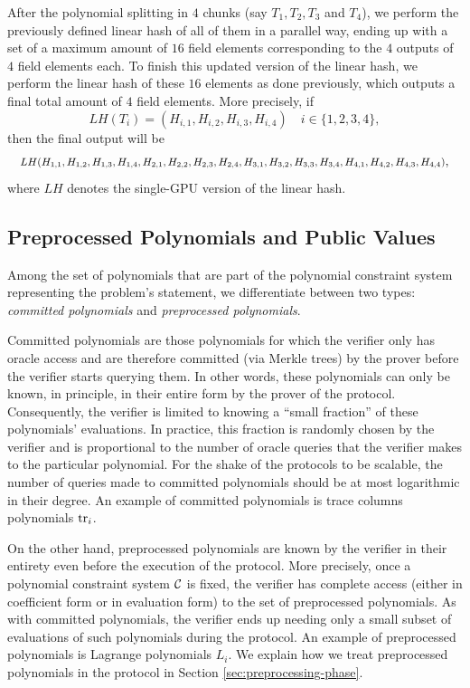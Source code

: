 After the polynomial splitting in $4$ chunks (say $T_1, T_2, T_3$ and $T_4$), we perform the previously defined linear hash of all of them in a parallel way, ending up with a set of a maximum amount of $16$ field elements corresponding to the $4$ outputs of $4$ field elements each. To finish this updated version of the linear hash, we perform the linear hash of these $16$ elements as done previously, which outputs a final total amount of $4$ field elements. More precisely, if 
\[
LH(T_i) = (H_{i, 1}, H_{i, 2}, H_{i, 3}, H_{i, 4})	\quad i \in \{1, 2, 3, 4\},
\]
then the final output will be
\[
\scalebox{0.85}{\mbox{\ensuremath{\displaystyle 
			LH(H_{1, 1}, H_{1, 2}, H_{1, 3}, H_{1, 4}, H_{2, 1}, H_{2, 2}, H_{2, 3}, H_{2, 4}, H_{3, 1}, H_{3, 2}, H_{3, 3}, H_{3, 4}, H_{4, 1}, H_{4, 2}, H_{4, 3}, H_{4, 4})
}}},
\]
where $LH$ denotes the single-GPU version of the linear hash. 


\fi



\subsection{Preprocessed Polynomials and Public Values}\label{sec:preprocessed-public}

Among the set of polynomials that are part of the polynomial constraint system representing the problem's statement, we differentiate between two types: \textit{committed polynomials} and \textit{preprocessed polynomials}. 

Committed polynomials are those polynomials for which the verifier only has oracle access and are therefore committed (via Merkle trees) by the prover before the verifier starts querying them. In other words, these polynomials can only be known, in principle, in their entire form by the prover of the protocol. Consequently, the verifier is limited to knowing a ``small fraction'' of these polynomials' evaluations. In practice, this fraction is randomly chosen by the verifier and is proportional to the number of oracle queries that the verifier makes to the particular polynomial. For the shake of the protocols to be scalable, the number of queries made to committed polynomials should be at most logarithmic in their degree. An example of committed polynomials is trace columns polynomials $\text{tr}_i$.

On the other hand, preprocessed polynomials are known by the verifier in their entirety even before the execution of the protocol. More precisely, once a polynomial constraint system $\mathcal{C}$ is fixed, the verifier has complete access (either in coefficient form or in evaluation form) to the set of preprocessed polynomials. As with committed polynomials, the verifier ends up needing only a small subset of evaluations of such polynomials during the protocol. An example of preprocessed polynomials is Lagrange polynomials $L_i$. We explain how we treat preprocessed polynomials in the protocol in Section \ref{sec:preprocessing-phase}.

